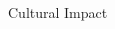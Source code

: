 \documentclass[presentation]{beamer}
\begin{document}
\begin{frame}{Cultural Impact}
\begin{columns}[T]
\begin{column}{0.55\textwidth}
\end{column}
\end{columns}
\end{frame}
\end{document}
